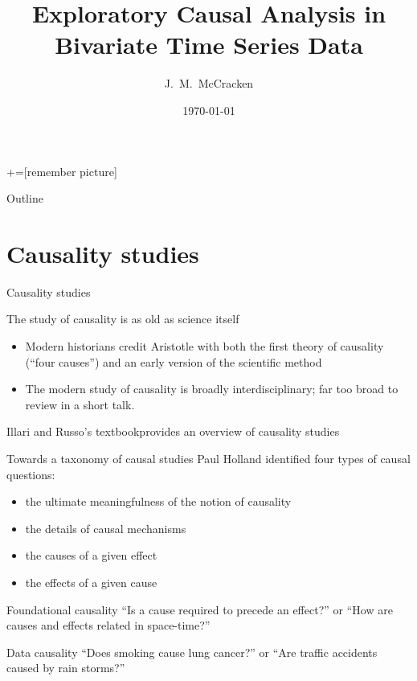 \documentclass{beamer}
\title[ECA w/ time series causality]{Exploratory Causal Analysis in Bivariate Time Series Data}
\author{J.\ M.\ McCracken}
\institute{GMU}
\date{\today}
\begin{document}
+=[remember picture]
\everymath{\displaystyle}


\begin{frame}
  \titlepage
\end{frame}

\begin{frame}{Outline}
 \tableofcontents
\end{frame}

\section{Causality studies}
\begin{frame}{Causality studies}
\begin{block}{The study of causality is as old as science itself }
\begin{itemize}
\item \vfill Modern historians credit Aristotle with both the first theory of causality (``four causes'') and an early version of the scientific method
\item \vfill The modern study of causality is broadly interdisciplinary; far too broad to review in a short talk.
\end{itemize}
\end{block}
\vspace{1cm}
Illari and Russo's textbook\footnotemark provides an overview of causality studies
\end{frame}

\begin{frame}{Towards a taxonomy of causal studies}
Paul Holland identified four types of causal questions\footnotemark:
\begin{itemize}
\item \alert<2>{the ultimate meaningfulness of the notion of causality}
\item \alert<2>{the details of causal mechanisms}
\item \alert<3>{the causes of a given effect}
\item \alert<3>{the effects of a given cause}
\end{itemize}
\pause
\vspace{0.25in}
\alert<2>{Foundational causality} ``Is a cause required to precede an effect?'' or  ``How are causes and effects related in space-time?''
\pause
\vspace{0.25in}

\alert<3>{Data causality} ``Does smoking cause lung cancer?'' or  ``Are traffic accidents caused by rain storms?''

\end{frame}
\end{document}
